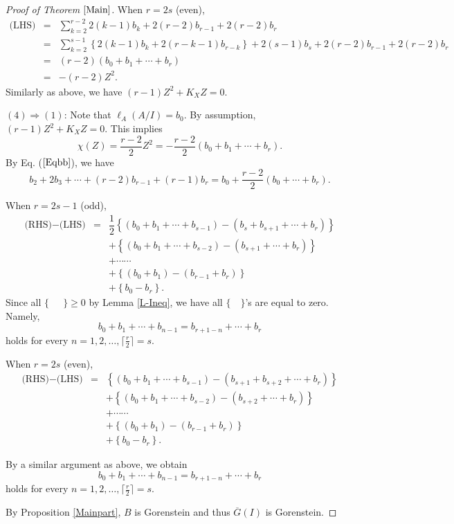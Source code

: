 \documentclass[12pt]{amsart}
\theoremstyle{definition}
\theoremstyle{remark}
\numberwithin{equation}{section}
\renewcommand{\:}{\colon}
\begin{document}
\begin{proof}[Proof of Theorem $\ref{Main}$]
When $r=2s$ (even), 
\begin{eqnarray*}
\text{(LHS)} &=& \sum_{k=2}^{r-2} 2(k-1)b_k + 2(r-2)b_{r-1}+2(r-2)b_r \\
&=& \sum_{k=2}^{s-1} \left\{2(k-1)b_k+2(r-k-1)b_{r-k} \right\}
+2(s-1)b_s+2(r-2)b_{r-1}+2(r-2)b_r \\
&=& (r-2)(b_0+b_1+\cdots+b_r) \\
&=& -(r-2)Z^2. 
\end{eqnarray*}
Similarly as above, we have $(r-1)Z^2 +K_XZ=0$. 
\par \vspace{2mm} \par \noindent 
$(4) \Longrightarrow (1)$: 
Note that $\ell_A(A/I)=b_0$. 
By assumption, $(r-1)Z^2+K_XZ=0$. 
This implies 
\[
\chi(Z)=\dfrac{r-2}{2}Z^2=-\dfrac{r-2}{2}(b_0+b_1+\cdots+b_r). 
\]
By Eq. ($\ref{Eqbb}$), we have 
\begin{equation} \label{Eqbbb}
b_2+2b_3+\cdots+(r-2)b_{r-1}+(r-1)b_r= b_0
+\dfrac{r-2}{2}(b_0+\cdots+b_r). 
\end{equation}
\par 
When $r=2s-1$ (odd), 
\begin{eqnarray*}
\text{(RHS)}-\text{(LHS)}
&=& \dfrac{1}{2} \left\{(b_0+b_1+\cdots +b_{s-1}) 
- (b_s+b_{s+1}+\cdots+b_r)  \right\} \\
& &+ \left\{(b_0+b_1+\cdots+b_{s-2})-(b_{s+1}+\cdots+b_r)\right\} \\
& &+ \cdots \cdots \\
& &+ \left\{(b_0+b_1)-(b_{r-1}+b_r) \right\} \\
& &+\left\{b_0-b_r\right\}. 
\end{eqnarray*}
Since all $\{~ \quad ~\} \ge 0$ 
by Lemma \ref{L-Ineq}, we have all $\{\quad \}$'s 
are equal to zero. 
Namely, 
\[
b_0+b_1+\cdots +b_{n-1} = b_{r+1-n}+\cdots + b_r 
\]
holds for every $n=1,2,\ldots, \lceil \frac{r}{2} \rceil=s$. 
\par \vspace{2mm}
When $r=2s$ (even),  
\begin{eqnarray*}
\text{(RHS)}-\text{(LHS)}
&=& \left\{(b_0+b_1+\cdots +b_{s-1}) 
- (b_{s+1}+b_{s+2}+\cdots+b_r)  \right\} \\
& &+ \left\{(b_0+b_1+\cdots+b_{s-2})-(b_{s+2}+\cdots+b_r)\right\} \\
& &+ \cdots \cdots \\
& &+ \left\{(b_0+b_1)-(b_{r-1}+b_r) \right\} \\
& &+\left\{b_0-b_r\right\}. 
\end{eqnarray*}
\par 
By a similar argument as above, we obtain 
\[
b_0+b_1+\cdots +b_{n-1} = b_{r+1-n}+\cdots + b_r 
\]
holds for every $n=1,2,\ldots, \lceil \frac{r}{2} \rceil=s$. 
\par \vspace{2mm}
By Proposition \ref{Mainpart}, $B$ is Gorenstein and thus 
$\overline{G}(I)$ is Gorenstein. 


\end{proof}
\end{document}
